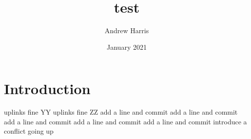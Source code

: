\documentclass{article}
\title{test}
\author{Andrew Harris}
\date{January 2021}
\begin{document}
\maketitle

\section{Introduction}
uplinks fine YY
uplinks fine ZZ
add a line and commit
add a line and commit
add a line and commit
add a line and commit
add a line and commit
introduce a conflict going up
\end{document}
